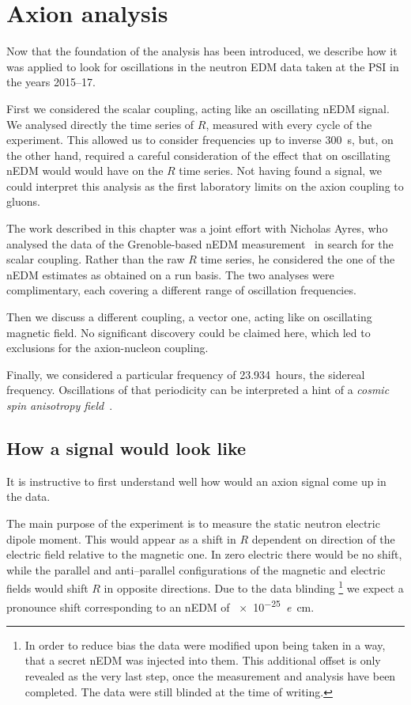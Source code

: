 \chapter{Axion analysis}
\label{ch:axion-analysis}

Now that the foundation of the analysis has been introduced, we describe how it was applied to look for oscillations in the neutron EDM data taken at the PSI in the years 2015--17.

First we considered the scalar coupling, acting like an oscillating nEDM signal. We analysed directly the time series of $R$, measured with every cycle of the experiment. This allowed us to consider frequencies up to inverse \SI{300}{\second}, but, on the other hand, required a careful consideration of the effect that on oscillating nEDM would would have on the $R$ time series. Not having found a signal, we could interpret this analysis as the first laboratory limits on the axion coupling to gluons.

The work described in this chapter was a joint effort with Nicholas Ayres, who analysed the data of the Grenoble-based nEDM measurement~\cite{AyresThesis} in search for the scalar coupling. Rather than the raw $R$ time series, he considered the one of the nEDM estimates as obtained on a run basis. The two analyses were complimentary, each covering a different range of oscillation frequencies.

Then we discuss a different coupling, a vector one, acting like on oscillating magnetic field. No significant discovery could be claimed here, which led to exclusions for the axion-nucleon coupling.

Finally, we considered a particular frequency of \num{23.934}~hours, the sidereal frequency.
Oscillations of that periodicity can be interpreted a hint of a \emph{cosmic spin anisotropy field}~\cite{Altarev2009}.



\section{How a signal would look like}
It is instructive to first understand well how would an axion signal come up in the data.

The main purpose of the experiment is to measure the static neutron electric dipole moment. This would appear as a shift in $R$ dependent on direction of the electric field relative to the magnetic one. In zero electric there would be no shift, while the parallel and anti--parallel configurations of the magnetic and electric fields would shift $R$ in opposite directions. Due to the data blinding
\footnote{In order to reduce bias the data were modified upon being taken in a way, that a secret nEDM was injected into them. This additional offset is only revealed as the very last step, once the measurement and analysis have been completed. The data were still blinded at the time of writing.}
we expect a pronounce shift corresponding to an nEDM of \SI{e-25}{\elementarycharge\centi\meter}.

